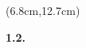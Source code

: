 \documentclass[a4paper]{article}
\begin{document}
\begin{textblock*}{5cm}(6.8cm,12.7cm)%
	\begin{minipage}{5cm} 
        \color{red}
        \large
        \textbf{1.}\hspace{1.5cm}\textbf{2.}\par
	\end{minipage}%
\end{textblock*}%
\end{document}
